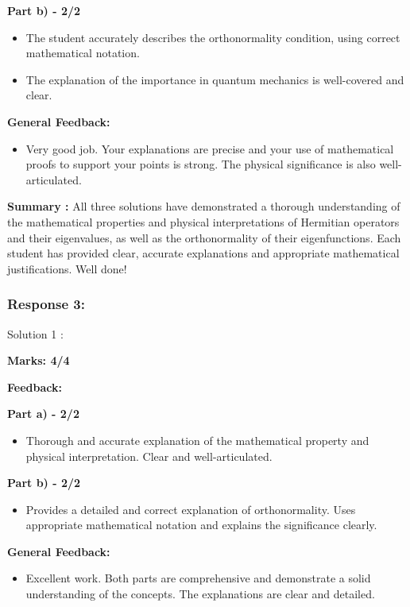 \documentclass[a4paper,11pt]{article}
\begin{document}
\textbf{Part b) - 2/2}

\begin{itemize}
    \item The student accurately describes the orthonormality condition, using correct mathematical notation.
    \item The explanation of the importance in quantum mechanics is well-covered and clear.
\end{itemize}

\textbf{General Feedback:}

\begin{itemize}
    \item Very good job. Your explanations are precise and your use of mathematical proofs to support your points is strong. The physical significance is also well-articulated.
\end{itemize}

\textbf{Summary :}
All three solutions have demonstrated a thorough understanding of the mathematical properties and physical interpretations of Hermitian operators and their eigenvalues, as well as the orthonormality of their eigenfunctions. Each student has provided clear, accurate explanations and appropriate mathematical justifications. Well done!


\subsubsection*{Response 3:}

Solution 1 :

\textbf{Marks: 4/4}

\textbf{Feedback:}

\textbf{Part a) - 2/2}

\begin{itemize}
    \item Thorough and accurate explanation of the mathematical property and physical interpretation. Clear and well-articulated.
\end{itemize}

\textbf{Part b) - 2/2}

\begin{itemize}
    \item Provides a detailed and correct explanation of orthonormality. Uses appropriate mathematical notation and explains the significance clearly.
\end{itemize}

\textbf{General Feedback:}

\begin{itemize}
    \item Excellent work. Both parts are comprehensive and demonstrate a solid understanding of the concepts. The explanations are clear and detailed.
\end{itemize}
\end{document}
